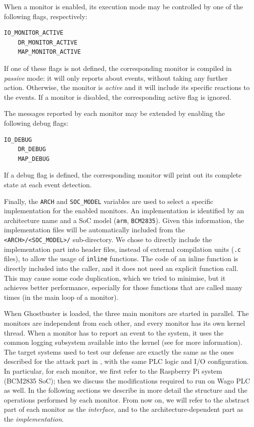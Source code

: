When a monitor is enabled, its execution mode may be controlled by one of the following flags, respectively:
\begin{Verbatim}[fontsize=\small]
	IO_MONITOR_ACTIVE
	DR_MONITOR_ACTIVE
	MAP_MONITOR_ACTIVE
\end{Verbatim}
If one of these flags is not defined, the corresponding monitor is compiled in \emph{passive} mode: it will only reports about events, without taking any further action.
Otherwise, the monitor is \emph{active} and it will include its specific reactions to the events.
If a monitor is disabled, the corresponding active flag is ignored.

The messages reported by each monitor may be extended by enabling the following debug flags:
\begin{Verbatim}[fontsize=\small]
	IO_DEBUG
	DR_DEBUG
	MAP_DEBUG
\end{Verbatim}
If a debug flag is defined, the corresponding monitor will print out its complete state at each event detection.

Finally, the \verb|ARCH| and \verb|SOC_MODEL| variables are used to select a specific implementation for the enabled monitors.
An implementation is identified by an architecture name and a SoC model (\eg \verb|arm|, \verb|BCM2835|). Given this information,
the implementation files will be automatically included from the \verb|<ARCH>/<SOC_MODEL>/| sub-directory.
We chose to directly include the implementation part into header files, instead of external compilation units (\verb|.c| files), to allow the usage of \verb|inline|
functions. The code of an inline function is directly included into the caller, and it does not need an explicit function call.
This may cause some code duplication, which we tried to minimise, but it achieves better performance,
especially for those functions that are called many times (\eg in the main loop of a monitor).

When Ghostbuster is loaded, the three main monitors are started in parallel.
The monitors are independent from each other, and every monitor has its own kernel thread.
When a monitor has to report an event to the system, it uses the common logging subsystem available into the kernel
(see  for more information).
The target systems used to test our defense are exactly the same as the ones described for the attack part in , with the same PLC logic and I/O configuration.
In particular, for each monitor, we first refer to the Raspberry Pi system (BCM2835 SoC); then we discuss the modifications required to run on Wago PLC as well.
In the following sections we describe in more detail the structure and the operations performed by each monitor.
From now on, we will refer to the abstract part of each monitor as the \emph{interface}, and to the architecture-dependent part as the \emph{implementation}.



